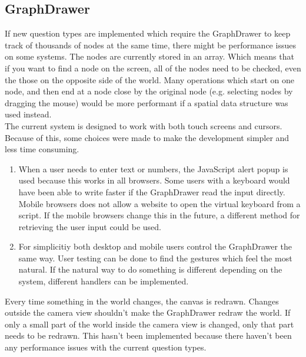 \subsection{GraphDrawer}
If new question types are implemented which require the GraphDrawer to keep track of thousands of nodes at the same time, there might be performance issues on some systems. The nodes are currently stored in an array. Which means that if you want to find a node on the screen, all of the nodes need to be checked, even the those on the opposite side of the world. Many operations which start on one node, and then end at a node close by the original node (e.g. selecting nodes by dragging the mouse) would be more performant if a spatial data structure\cite{SpatialDatastructure} was used instead.
\\[11pt]
The current system is designed to work with both touch screens and cursors. Because of this, some choices were made to make the development simpler and less time consuming.
\begin{enumerate}
    \item When a user needs to enter text or numbers, the JavaScript alert popup is used because this works in all browsers. Some users with a keyboard would have been able to write faster if the GraphDrawer read the input directly. Mobile browsers does not allow a website to open the virtual keyboard from a script. If the mobile browsers change this in the future, a different method for retrieving the user input could be used.
    \item For simplicitiy both desktop and mobile users control the GraphDrawer the same way. User testing can be done to find the gestures which feel the most natural. If the natural way to do something is different depending on the system, different handlers can be implemented.
\end{enumerate}
Every time something in the world changes, the canvas is redrawn. Changes outside the camera view shouldn't make the GraphDrawer redraw the world. If only a small part of the world inside the camera view is changed, only that part needs to be redrawn. This hasn't been implemented because there haven't been any performance issues with the current question types.
